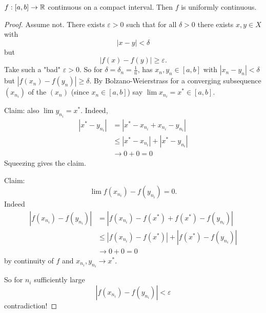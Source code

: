 \documentclass[10pt, a4paper]{article}
\begin{document}
\begin{theorem}
    $f : [a, b] \to \mathbb{R}$ continuous on a compact interval.
    Then $f$ is uniformly continuous.
    \begin{proof}
        Assume not.
        There exists $\varepsilon > 0$ such that for all $\delta > 0$ there exists $x, y \in X$ with
        \[
        |x - y| < \delta
        \]
        but
        \[
        |f(x) - f(y)| \geq \varepsilon.
        \]
        Take such a "bad" $\varepsilon > 0$.
        So for $\delta = \delta_n = \frac{1}{n}$,
        has $x_n, y_n \in [a, b]$ with $|x_n - y_n| < \delta$ but $|f(x_n) - f(y_n)| \geq \delta$.
        By Bolzano-Weierstrass for a converging subsequence $(x_{n_i})$ of the $(x_n)$
        (since $x_n \in [a, b]$)
        say $\lim x_{n_i} = x ^ {*} \in [a, b]$.

        Claim:
        also $\lim y_{n_i} = x ^ {*}$.
        Indeed,
        \begin{align*}
            |x ^ {*} - y_{n_i}| &= |x ^ {*} - x_{n_i} + x_{n_i} - y_{n_i}| \\
            &\leq |x ^ {*} - x_{n_i}| + |x ^ {*} - y_{n_i}| \\
            &\to 0 + 0 = 0
        \end{align*}
        Squeezing gives the claim.

        Claim:
        \[
        \lim f(x_{n_i}) - f(y_{n_i}) = 0.
        \]
        Indeed
        \begin{align*}
            |f(x_{n_i}) - f(y_{n_i})| &= |f(x_{n_i}) - f(x ^ {*}) + f(x ^ {*}) - f(y_{n_i})| \\
            &\leq |f(x_{n_i}) - f(x ^ {*})| + |f(x ^ {*}) - f(y_{n_i})| \\
            &\to 0 + 0 = 0
        \end{align*}
        by continuity of $f$ and $x_{n_i}, y_{n_i} \to x ^ {*}$.

        So for $n_i$ sufficiently large
        \[
        |f(x_{n_i}) - f(y_{n_i})| < \varepsilon
        \]
        contradiction!
    \end{proof}
\end{theorem}
\end{document}
